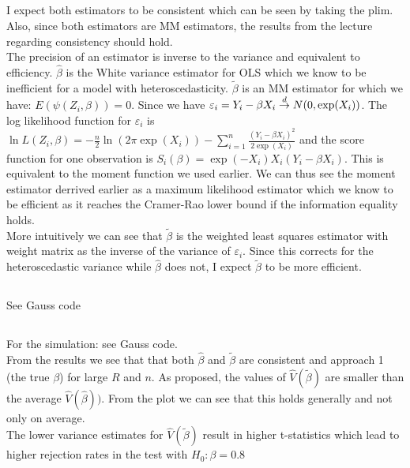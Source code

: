 \documentclass[11pt]{article}
\theoremstyle{break}
\begin{document}
\subsection{}
I expect both estimators to be consistent which can be seen by taking the plim. Also, since both estimators are MM estimators, the results from the lecture regarding consistency should hold. \\
The precision of an estimator is inverse to the variance and equivalent to efficiency. $\hat{\beta}$ is the White variance estimator for OLS which we know to be inefficient for a model with heteroscedasticity. $\tilde{\beta}$ is an MM estimator for which we have: $E(\psi(Z_i, \beta)) = 0$. Since we have $\varepsilon_i = Y_i - \beta X_i \;{\buildrel d \over \rightarrow}\; N(0, \exp(X_i))$. The log likelihood function for $\varepsilon_i$ is $\ln L(Z_i, \beta) = -\frac{n}{2}\ln(2\pi\exp(X_i)) - \displaystyle \sum_{i=1}^n \frac{(Y_i - \beta X_i)^2}{2\exp(X_i)}$ and the score function for one observation is $S_i(\beta) = \exp(-X_i)X_i(Y_i-\beta X_i)$. This is equivalent to the moment function we used earlier. We can thus see the moment estimator derrived earlier as a maximum likelihood estimator which we know to be efficient as it reaches the Cramer-Rao lower bound if the information equality holds. \\
More intuitively we can see that $\tilde{\beta}$ is the weighted least squares estimator with weight matrix as the inverse of the variance of $\varepsilon_i$. Since this corrects for the heteroscedastic variance while $\hat{\beta}$ does not, I expect $\tilde{\beta}$ to be more efficient.

\subsection{}
See Gauss code

\subsection{}
For the simulation: see Gauss code. \\
From the results we see that that both $\hat{\beta}$ and $\tilde{\beta}$ are consistent and approach 1 (the true $\beta$) for large $R$ and $n$. As proposed, the values of $\hat{V}(\tilde{\beta})$ are smaller than the average $\hat{V}(\hat{\beta}))$. From the plot we can see that this holds generally and not only on average. \\
The lower variance estimates for $\hat{V}(\tilde{\beta})$ result in higher t-statistics which lead to higher rejection rates in the test with $H_0:\beta=0.8$
\end{document}
